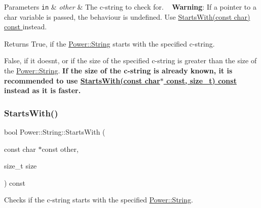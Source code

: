 \begin{DoxyParams}[1]{Parameters}
\mbox{\tt in}  & {\em other} & The c-\/string to check for. ~\newline
 {\bfseries Warning}\+: If a pointer to a char variable is passed, the behaviour is undefined. Use \hyperlink{class_power_1_1_string_a7c32b540950bc8b7061751333ec8ef17}{Starts\+With(const char) const }instead. \\
\hline
\end{DoxyParams}
\begin{DoxyReturn}{Returns}
True, if the \hyperlink{class_power_1_1_string}{Power\+::\+String} starts with the specified c-\/string. 

False, if it doesn\textquotesingle{}t, or if the size of the specified c-\/string is greater than the size of the \hyperlink{class_power_1_1_string}{Power\+::\+String}.  {\bfseries If the size of the c-\/string is already known, it is recommended to use \hyperlink{class_power_1_1_string_a44421001e181eeba0531f76f933abe4e}{Starts\+With(const char$\ast$ const, size\+\_\+t) const }instead as it is faster.} 
\end{DoxyReturn}
\mbox{\label{class_power_1_1_string_a44421001e181eeba0531f76f933abe4e}} 
\subsubsection{\texorpdfstring{Starts\+With()}{StartsWith()}\hspace{0.1cm}{\footnotesize\ttfamily [3/4]}}
{\footnotesize\ttfamily bool Power\+::\+String\+::\+Starts\+With (\begin{DoxyParamCaption}\item[{const char $\ast$const}]{other,  }\item[{size\+\_\+t}]{size }\end{DoxyParamCaption}) const\hspace{0.3cm}{\ttfamily [inline]}}



Checks if the c-\/string starts with the specified \hyperlink{class_power_1_1_string}{Power\+::\+String}. 


